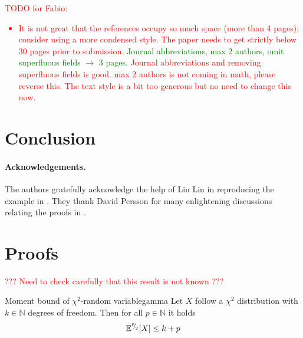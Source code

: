 \documentclass[12pt]{article}
\begin{document}
\textcolor{red}{TODO for Fabio:
\begin{itemize}
 \item It is not great that the references occupy so much space (more than 4 pages); consider using a more condensed style. The paper needs to get strictly below 30 pages prior to submission. \textcolor{green}{Journal abbreviations, max 2 authors, omit superfluous fields $\to$ 3 pages.}
 Journal abbreviations and removing superfluous fields is good. max 2 authors is not coming in math, please reverse this. The text style is a bit too generous but no need to change this now.
\end{itemize}
}
\color{blue}



%




\section{Conclusion}
\label{sec:conclusion}


\paragraph{Acknowledgements.} The authors gratefully acknowledge the help of Lin Lin in reproducing the example in . They thank David Persson for many enlightening discussions relating the proofs in .

\printbibliography

\appendix

\section{Proofs}

\textcolor{red}{??? Need to check carefully that this result is not known ???}

\begin{lemma}{Moment bound of $\chi^2$-random variable}{gamma}
    Let $X$ follow a $\chi^2$ distribution with $k \in \mathbb{N}$ degrees of freedom. Then for all $p \in \mathbb{N}$ it holds
    \begin{equation}
        \mathbb{E}^{{}^{p}{\mskip -5mu/\mskip -3mu}_{2}}[X] \leq k + p
    \end{equation}
\end{lemma}
\end{document}
